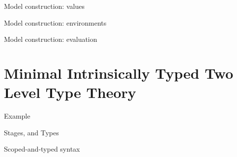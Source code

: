 \documentclass[aspectratio=169]{beamer}
\begin{document}
\begin{frame}{Model construction: values}


\end{frame}

\begin{frame}{Model construction: environments}

\end{frame}

\begin{frame}{Model construction: evaluation}
  \begin{AgdaSuppressSpace}
  \end{AgdaSuppressSpace}
\end{frame}


\section{Minimal Intrinsically Typed Two Level Type Theory}

\begin{frame}{Example}
\end{frame}

\begin{frame}{Stages, and Types}
\end{frame}

\begin{frame}{Scoped-and-typed syntax}
  \begin{AgdaSuppressSpace}

    \medskip

    \medskip
  \end{AgdaSuppressSpace}

  \bigskip

\end{frame}
\end{document}
